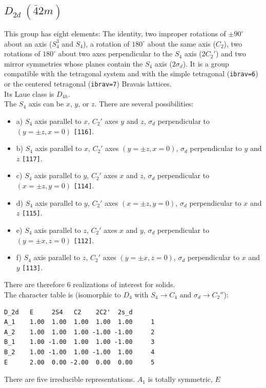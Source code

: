 \documentclass[12pt,a4paper]{article}
\begin{document}
\subsection{\color{web-blue}$D_{2d}\ (\bar 42m)$} 
This group has eight elements: The identity, two improper rotations 
of $\pm90^\circ$ about an axis ($S_4^3$ and $S_4$), a rotation of 
$180^\circ$ about the same axis ($C_2$), two rotations of $180^\circ$ about
two axes perpendicular to the $S_4$ axis ($2C_2'$) and two mirror symmetries
whose planes contain the $S_4$ axis ($2\sigma_d$).
It is a group compatible with the tetragonal system and with the simple 
tetragonal (\texttt{ibrav=6}) or the centered tetragonal (\texttt{ibrav=7}) 
Bravais lattices. \\
Its Laue class is $D_{4h}$. \\
The $S_4$ axis can be $x$, $y$, or $z$. There are several possibilities:
\begin{itemize}
\item a) $S_4$ axis parallel to $x$, $C_2'$ axes $y$ and $z$, $\sigma_d$
perpendicular to $(y=\pm z, x=0)$ \texttt{[116]}.
\item b) $S_4$ axis parallel to $x$, $C_2'$ axes $(y=\pm z, x=0)$, $\sigma_d$
perpendicular to $y$ and $z$ \texttt{[117]}.
\item c) $S_4$ axis parallel to $y$, $C_2'$ axes $x$ and $z$, $\sigma_d$
perpendicular to $(x=\pm z, y=0)$ \texttt{[114]}.
\item d) $S_4$ axis parallel to $y$, $C_2'$ axes $(x=\pm z, y=0)$, $\sigma_d$
perpendicular to $x$ and $z$ \texttt{[115]}.
\item e) $S_4$ axis parallel to $z$, $C_2'$ axes $x$ and $y$, $\sigma_d$
perpendicular to $(y=\pm x, z=0)$ \texttt{[112]}.
\item f) $S_4$ axis parallel to $z$, $C_2'$ axes $(y=\pm x, z=0)$, $\sigma_d$
perpendicular to $x$ and $y$ \texttt{[113]}.
\end{itemize}
There are therefore $6$ realizations of interest for solids.\\
The character table is (isomorphic to $D_4$ with $S_4 \rightarrow C_4$
and $\sigma_d \rightarrow C_2''$):
\begin{verbatim}
D_2d   E     2S4   C2    2C2'  2s_d
A_1    1.00  1.00  1.00  1.00  1.00     1
A_2    1.00  1.00  1.00 -1.00 -1.00     2
B_1    1.00 -1.00  1.00  1.00 -1.00     3
B_2    1.00 -1.00  1.00 -1.00  1.00     4
E      2.00  0.00 -2.00  0.00  0.00     5
\end{verbatim}
There are five irreducible representations. $A_1$ is totally symmetric, $E$
\end{document}
